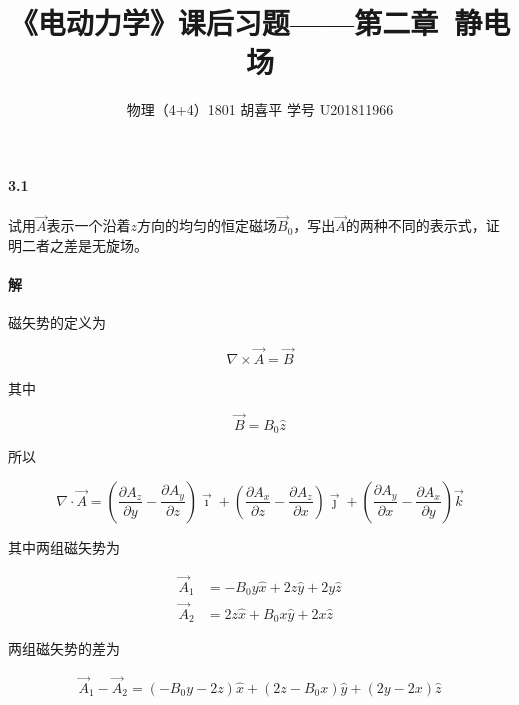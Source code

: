 \documentclass{article}
\author{物理（4+4）1801 \quad 胡喜平 \quad 学号 U201811966}
\affil{网站 https://hxp.plus/ \quad 邮件 hxp201406@gmail.com}
\title{《电动力学》课后习题——第二章\ 静电场}
\begin{document}
\maketitle\thispagestyle{fancy}

\paragraph{3.1}

试用$\vec{A}$表示一个沿着$z$方向的均匀的恒定磁场$\vec{B}_0$，写出$\vec{A}$的两种不同的表示式，证明二者之差是无旋场。

\paragraph{解}

磁矢势的定义为

\begin{equation*}
  \nabla \times \vec{A} = \vec{B}
\end{equation*}

其中

\begin{equation*}
  \vec{B} = B_0 \hat{z}
\end{equation*}

所以

\begin{equation*}
  \nabla \cdot \vec{A} =
  \left( \frac{\partial A_{z}}{\partial y} - \frac{\partial A_{y}}{\partial z} \right) \vec{\imath}
  + \left( \frac{\partial A_{x}}{\partial z} - \frac{\partial A_{z}}{\partial x} \right) \vec{\jmath}
  + \left( \frac{\partial A_{y}}{\partial x} - \frac{\partial A_{x}}{\partial y} \right) \vec{k}
\end{equation*}

其中两组磁矢势为

\begin{equation*}
  \begin{aligned}
    \vec{A}_1 &= -B_0 y \hat{x} + 2 z \hat{y} + 2 y \hat{z} \\
    \vec{A}_2 &= 2 z \hat{x} + B_0 x \hat{y} + 2 x \hat{z}
  \end{aligned}
\end{equation*}

两组磁矢势的差为

\begin{equation*}
  \begin{aligned}
    \vec{A}_1 - \vec{A}_2 = 
    \left( - B_{0} y - 2z \right) \hat{x} + \left( 2z - B_0 x \right) \hat{y} + \left( 2y - 2x \right) \hat{z}
  \end{aligned}
\end{equation*}
\end{document}
